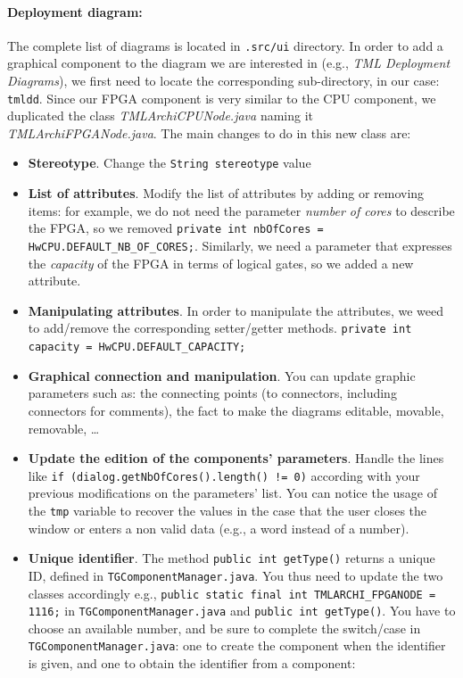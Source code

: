 \documentclass[12pt]{article}
\begin{document}
\paragraph{Deployment diagram:} The complete list of diagrams is located in \texttt{.src/ui} directory. In order to add a graphical component to the diagram we are interested in (e.g., \textit{TML Deployment Diagrams}), we first need to locate the corresponding sub-directory, in our case:  \texttt{tmldd}. Since our FPGA component is very similar to  the CPU component, we duplicated the class \textit{TMLArchiCPUNode.java} naming it \textit{TMLArchiFPGANode.java}. The main changes to do in this new class are: 
\begin{itemize}
\item \textbf{Stereotype}. Change the \texttt{String stereotype} value

\item \textbf{List of attributes}. Modify the list of attributes by adding or removing items: for example, we do not need the parameter \textit{number of cores} to describe the FPGA, so we removed \texttt{private int nbOfCores = HwCPU.DEFAULT\_NB\_OF\_CORES;}. Similarly, we need  a parameter that expresses the \textit{capacity} of the FPGA in terms of logical gates, so we added a new attribute.

\item \textbf{Manipulating attributes}. In order to manipulate the attributes, we weed to add/remove the corresponding setter/getter methods.
\texttt{private int capacity = HwCPU.DEFAULT\_CAPACITY;}

\item \textbf{Graphical connection and manipulation}. You can update graphic parameters such as: the connecting points (to connectors, including connectors for comments), the fact to make the diagrams editable, movable, removable, \ldots 

\item \textbf{Update the edition of the components' parameters}. Handle the lines like \texttt{if (dialog.getNbOfCores().length() != 0)} according with your previous modifications on the parameters' list. You can notice the usage of the \texttt{tmp} variable to recover the values in the case that the user closes the window or enters a non valid data (e.g., a word instead of a number).

\item \textbf{Unique identifier}. The method \texttt{public int getType()} returns a unique ID, defined in \texttt{TGComponentManager.java}. You thus need to update the two classes accordingly e.g., \texttt{public static final int TMLARCHI\_FPGANODE = 1116;} in \texttt{TGComponentManager.java} and  \texttt{public int getType()}. You have to choose an available number, and be sure to complete the switch/case in  \texttt{TGComponentManager.java}: one to create the component when the identifier is given, and one to obtain the identifier from a component:


\end{itemize}
\end{document}

